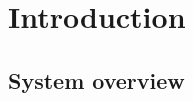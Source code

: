 \documentclass[12pt,a4paper]{report}
\begin{document}
\section{Introduction}




% 



\subsection{System overview}




% 

\end{document}
